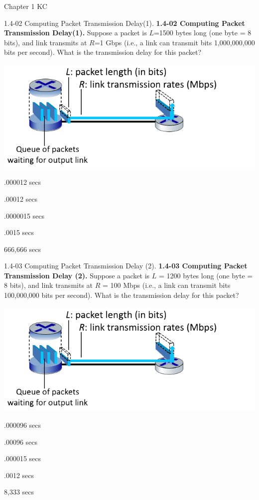 \documentclass[a4paper]{article}
\begin{document}
\begin{quiz}{Chapter 1 KC}
\begin{multi}[points=1]{1.4-02 Computing Packet Transmission Delay(1).}
\textbf{1.4-02 Computing Packet Transmission Delay(1).} 
Suppose a packet is $L$=1500 bytes long (one byte = 8 bits), and link transmits at $R$=1 Gbps (i.e., a link can transmit bits 1,000,000,000 bits per second).  
What is the transmission delay for this packet?
\begin{center}
\includegraphics[width=\linewidth]{figs/1.4.2.png}
\end{center}
\item* .000012 secs
\item .00012 secs
\item .0000015 secs
\item .0015 secs
\item 666,666 secs
\end{multi}

\begin{multi}[points=1]{1.4-03 Computing Packet Transmission Delay (2).}
\textbf{1.4-03 Computing Packet Transmission Delay (2).} 
Suppose a packet is $L$ = 1200 bytes long (one byte = 8 bits), and link transmits at $R$ = 100 Mbps (i.e., a link can transmit bits 100,000,000 bits per second).  What is the transmission delay for this packet?
\begin{center}
\includegraphics[width=\linewidth]{figs/1.4.2.png}
\end{center}
\item* .000096 secs
\item .00096 secs
\item .000015 secs
\item .0012 secs
\item 8,333 secs
\end{multi}


\end{quiz}
\end{document}
